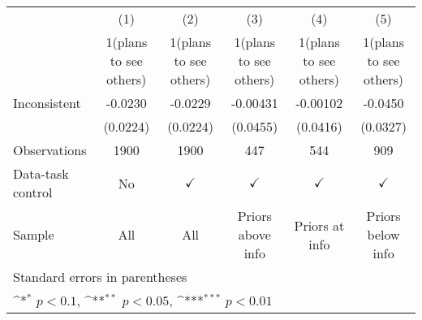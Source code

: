 {
\def\sym#1{\ifmmode^{#1}\else\(^{#1}\)\fi}
\begin{tabular}{l*{5}{c}}
\hline\hline
                    &\multicolumn{1}{c}{(1)}         &\multicolumn{1}{c}{(2)}         &\multicolumn{1}{c}{(3)}         &\multicolumn{1}{c}{(4)}         &\multicolumn{1}{c}{(5)}         \\
                    &1(plans to see others)         &1(plans to see others)         &1(plans to see others)         &1(plans to see others)         &1(plans to see others)         \\
\hline
Inconsistent        &     -0.0230         &     -0.0229         &    -0.00431         &    -0.00102         &     -0.0450         \\
                    &    (0.0224)         &    (0.0224)         &    (0.0455)         &    (0.0416)         &    (0.0327)         \\
\hline
Observations        &        1900         &        1900         &         447         &         544         &         909         \\
Data-task control   &          No         &$\checkmark$         &$\checkmark$         &$\checkmark$         &$\checkmark$         \\
Sample              &         All         &         All         &Priors above info         &Priors at info         &Priors below info         \\
\hline\hline
\multicolumn{6}{l}{\footnotesize Standard errors in parentheses}\\
\multicolumn{6}{l}{\footnotesize \sym{*} \(p<0.1\), \sym{**} \(p<0.05\), \sym{***} \(p<0.01\)}\\
\end{tabular}
}
